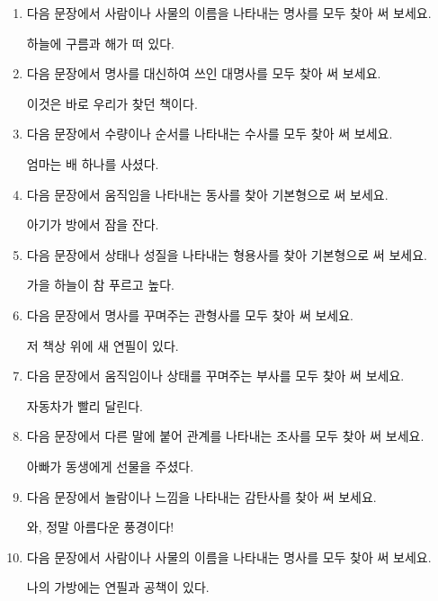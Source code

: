 \documentclass[fs9,seriesFre]{korfarm-base}
\begin{document}
\kfActivityBg {}
\par{}\par\nopagebreak[4]\smallskip\nopagebreak[4]
\begin{enumerate}[leftmargin=22pt, itemsep=6pt, topsep=4pt, label=\textbf{\arabic*.}]
\item 다음 문장에서 사람이나 사물의 이름을 나타내는 명사를 모두 찾아 써 보세요.
\begin{kfEvidence}하늘에 구름과 해가 떠 있다.\end{kfEvidence}
\item 다음 문장에서 명사를 대신하여 쓰인 대명사를 모두 찾아 써 보세요.
\begin{kfEvidence}이것은 바로 우리가 찾던 책이다.\end{kfEvidence}
\item 다음 문장에서 수량이나 순서를 나타내는 수사를 모두 찾아 써 보세요.
\begin{kfEvidence}엄마는 배 하나를 사셨다.\end{kfEvidence}
\item 다음 문장에서 움직임을 나타내는 동사를 찾아 기본형으로 써 보세요.
\begin{kfEvidence}아기가 방에서 잠을 잔다.\end{kfEvidence}
\item 다음 문장에서 상태나 성질을 나타내는 형용사를 찾아 기본형으로 써 보세요.
\begin{kfEvidence}가을 하늘이 참 푸르고 높다.\end{kfEvidence}
\item 다음 문장에서 명사를 꾸며주는 관형사를 모두 찾아 써 보세요.
\begin{kfEvidence}저 책상 위에 새 연필이 있다.\end{kfEvidence}
\item 다음 문장에서 움직임이나 상태를 꾸며주는 부사를 모두 찾아 써 보세요.
\begin{kfEvidence}자동차가 빨리 달린다.\end{kfEvidence}
\item 다음 문장에서 다른 말에 붙어 관계를 나타내는 조사를 모두 찾아 써 보세요.
\begin{kfEvidence}아빠가 동생에게 선물을 주셨다.\end{kfEvidence}
\item 다음 문장에서 놀람이나 느낌을 나타내는 감탄사를 찾아 써 보세요.
\begin{kfEvidence}와, 정말 아름다운 풍경이다!\end{kfEvidence}
\item 다음 문장에서 사람이나 사물의 이름을 나타내는 명사를 모두 찾아 써 보세요.
\begin{kfEvidence}나의 가방에는 연필과 공책이 있다.\end{kfEvidence}
\end{enumerate}
\end{document}
